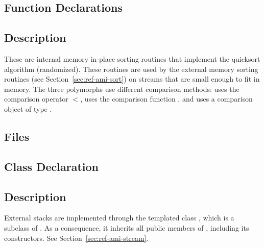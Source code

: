 \subsection{Function Declarations}

  \btabb
      {}

      {}

      {}
  \etabb

\subsection{Description}

These are internal memory in-place sorting routines that implement the
quicksort algorithm (randomized).  These routines are used by the external
memory sorting routines (see Section~\ref{sec:ref-ami-sort}) on streams
that are small enough to fit in memory.
The three polymorphs use different comparison methods:
 uses the comparison operator $<$,
 uses the comparison function , and
 uses a comparison object of type .


\subsection{Files}
  \btabb
         {}
  \etabb

\subsection{Class Declaration}
   \btabb
         {}
   \etabb

\subsection{Description}
External stacks are implemented through the templated class
, 
which is a subclass of . As a consequence, it
inherits all public members of , including its
constructors. See Section~\ref{sec:ref-ami-stream}.

